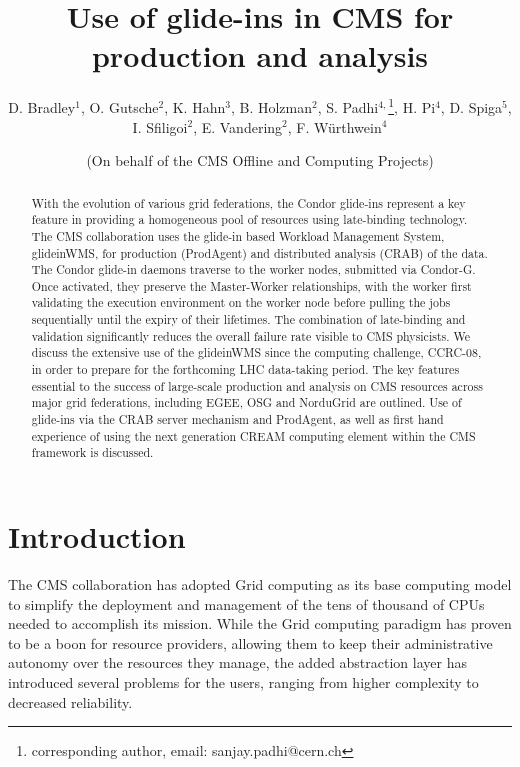 \documentclass[a4paper]{jpconf}
\begin{document}
\title{Use of glide-ins in CMS for production and analysis}
\author{D. Bradley$^1$, O. Gutsche$^2$, K. Hahn$^3$, B. Holzman$^2$, S. Padhi$^{4,}$\footnote[6]{corresponding author, email: sanjay.padhi@cern.ch}, H. Pi$^4$, D. Spiga$^5$, I. Sfiligoi$^2$, E. Vandering$^2$, F. W\"urthwein$^4$}
\address{$^1$ University of Wisconsin-Madison, Madison, WI, USA}
\address{$^2$ Fermilab, Batavia, IL, USA}
\address{$^3$ Massachusetts Institute of Technology, Cambridge, MA, USA}
\address{$^4$ University of California, San Diego, La Jolla, CA, USA}
\address{$^5$ CERN, CH-1211 Geneva, Switzerland}
\author{(On behalf of the CMS Offline and Computing Projects)}
\begin{abstract}
With the evolution of various grid federations, the Condor glide-ins represent a key feature in providing a homogeneous pool of resources using late-binding technology. The CMS collaboration uses the glide-in based Workload Management System, glideinWMS, for production (ProdAgent) and distributed analysis (CRAB) of the data. The Condor glide-in daemons traverse to the worker nodes, submitted via Condor-G. Once activated, they preserve the Master-Worker relationships, with the worker first validating the execution environment on the worker node before pulling the jobs sequentially until the expiry of their lifetimes. The combination of late-binding and validation significantly reduces the overall failure rate visible to CMS physicists. We discuss the extensive use of the glideinWMS since the computing challenge, CCRC-08, in order to prepare for the forthcoming LHC data-taking period. The key features essential to the success of large-scale production and analysis on CMS resources across major grid federations, including EGEE, OSG and NorduGrid are outlined. Use of glide-ins via the CRAB server mechanism and ProdAgent, as well as first hand experience of using the next generation CREAM computing element within the CMS framework is discussed.
\end{abstract}
\section{Introduction}
The CMS collaboration has adopted Grid computing as its base computing model to simplify the deployment and management of the
tens of thousand of CPUs needed to accomplish its mission.
While the Grid computing paradigm has proven to be a boon for resource providers, 
allowing them to keep their administrative autonomy over the resources they manage,
the added abstraction layer has introduced several problems for the users, 
ranging from higher complexity to decreased reliability.
\end{document}
